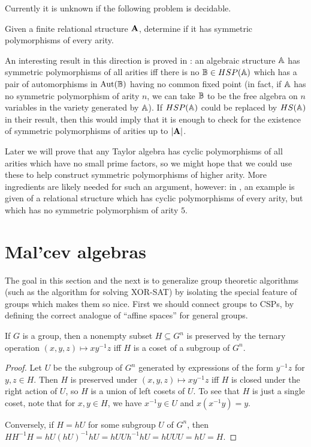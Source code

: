 \documentclass[letterpaper,11pt]{article}
\DeclareMathOperator{\Aut}{Aut}
\begin{document}
Currently it is unknown if the following problem is decidable.

\begin{prob} Given a finite relational structure $\mathbf{A}$, determine if it has symmetric polymorphisms of every arity.
\end{prob}

An interesting result in this direction is proved in \cite{symmetric-polymorphisms}: an algebraic structure $\mathbb{A}$ has symmetric polymorphisms of all arities iff there is no $\mathbb{B} \in HSP(\mathbb{A})$ which has a pair of automorphisms in $\Aut(\bB)$ having no common fixed point (in fact, if $\mathbb{A}$ has no symmetric polymorphism of arity $n$, we can take $\mathbb{B}$ to be the free algebra on $n$ variables in the variety generated by $\mathbb{A}$). If $HSP(\mathbb{A})$ could be replaced by $HS(\mathbb{A})$ in their result, then this would imply that it is enough to check for the existence of symmetric polymorphisms of arities up to $|\mathbf{A}|$.

Later we will prove that any Taylor algebra has cyclic polymorphisms of all arities which have no small prime factors, so we might hope that we could use these to help construct symmetric polymorphisms of higher arity. More ingredients are likely needed for such an argument, however: in \cite{symmetric-polymorphisms}, an example is given of a relational structure which has cyclic polymorphisms of every arity, but which has no symmetric polymorphism of arity $5$.


\section{Mal'cev algebras}

The goal in this section and the next is to generalize group theoretic algorithms (such as the algorithm for solving XOR-SAT) by isolating the special feature of groups which makes them so nice. First we should connect groups to CSPs, by defining the correct analogue of ``affine spaces'' for general groups.

\begin{prop} If $G$ is a group, then a nonempty subset $H \subseteq G^n$ is preserved by the ternary operation $(x,y,z) \mapsto xy^{-1}z$ iff $H$ is a coset of a subgroup of $G^n$.
\end{prop}
\begin{proof} Let $U$ be the subgroup of $G^n$ generated by expressions of the form $y^{-1}z$ for $y,z \in H$. Then $H$ is preserved under $(x,y,z) \mapsto xy^{-1}z$ iff $H$ is closed under the right action of $U$, so $H$ is a union of left cosets of $U$. To see that $H$ is just a single coset, note that for $x,y \in H$, we have $x^{-1}y \in U$ and $x(x^{-1}y) = y$.

Conversely, if $H = hU$ for some subgroup $U$ of $G^n$, then $HH^{-1}H = hU(hU)^{-1}hU = hUUh^{-1}hU = hUUU = hU = H$.
\end{proof}
\end{document}
